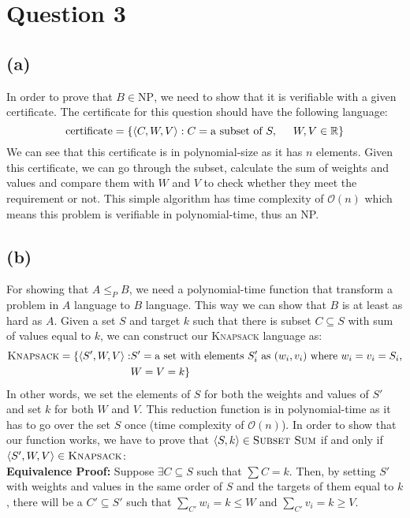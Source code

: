 \section{Question 3}
\subsection{(a)}
In order to prove that $B \in \text{NP}$, we need to show that it is verifiable with a given certificate.
The certificate for this question should have the following language:
\[\text{certificate}=\{\langle C, W, V \rangle : C = \text{a subset of } S, \hspace{5mm} W,V \in \mathbb{R}\}\]
We can see that this certificate is in polynomial-size as it has $n$ elements. Given this certificate, we can go through the subset, calculate the sum of weights and values and compare them with $W$ and $V$ to
check whether they meet the requirement or not. This simple algorithm has time complexity of $\mathcal{O}(n)$ which means
this problem is verifiable in polynomial-time, thus an NP. 
\subsection{(b)}
For showing that $A \leq_P B$, we need a polynomial-time function that transform a problem in $A$ language to $B$ language.
This way we can show that $B$ is at least as hard as $A$. Given a set $S$ and target $k$ such that there is subset $C \subseteq S$ with sum
of values equal to $k$, we can construct our \textsc{Knapsack} language as:
\begin{equation}
    \begin{aligned}
        \textsc{Knapsack}=\{\langle S', W, V \rangle : & S' = \text{a set with elements } S'_i \text{ as } (w_i, v_i) \text{ where } w_i=v_i=S_i, \\
        & W=V=k\}
    \end{aligned}
\end{equation}
In other words, we set the elements of $S$ for both the weights and values of $S'$ and set $k$ for both $W$ and $V$. This reduction function is in polynomial-time
as it has to go over the set $S$ once (time complexity of $\mathcal{O}(n)$). In order to show that our function works, we have to prove that
$\langle S, k \rangle \in \textsc{Subset Sum}$ if and only if $\langle S', W, V \rangle \in \textsc{Knapsack}$: \\

\textbf{Equivalence Proof:} Suppose $\exists C \subseteq S$ such that $\sum C = k$. Then, by setting $S'$ with weights and values in the same order of $S$ and the targets of them equal to $k$, there will be a 
$C' \subseteq S'$ such that $\sum_{C'}w_i=k\leq W$ and $\sum_{C'}v_i=k\geq V$.

